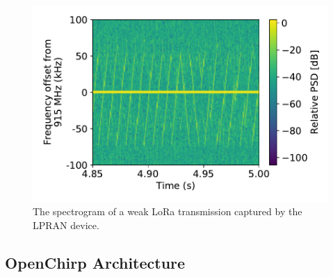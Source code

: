 \documentclass[conference]{IEEEtran}
\begin{document}
\begin{figure}[!htb]
    \centering
    \includegraphics[width=0.8\linewidth]{figures/LPRAN_spectrogram}
    \caption{The spectrogram of a weak LoRa transmission captured by the LPRAN device.}
    \label{fig:lpran-spectrogram}
\end{figure}

\subsection{OpenChirp Architecture}
\label{sec:oc-arch}
\end{document}
